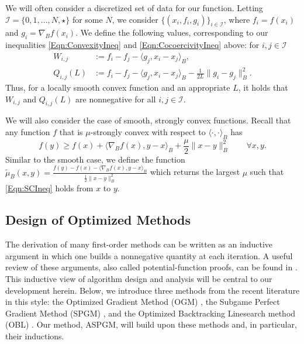 \documentclass[11pt]{article}
\numberwithin{equation}{section}
\newcommand{\I}{\mathcal{I}}
\newcommand{\gradB}{\nabla_{\!\!{\scriptscriptstyle B}}}
\newcommand{\dotB}[2]{\langle {#1}, {#2} \rangle_B}
\newcommand{\normB}[1]{\|{#1}\|_B}
\theoremstyle{definition}
\theoremstyle{plain}
\theoremstyle{definition}
\begin{document}
We will often consider a discretized set of data for our function. Letting $\I = \{0, 1, \dots, N, \star\}$ for some $N$, we consider $\{(x_i, f_i, g_i) \}_{i \in \I}$, where $f_i = f(x_i)$ and $g_i = \gradB f(x_i)$. We define the following values, corresponding to our inequalities \eqref{Eqn:ConvexityIneq} and \eqref{Eqn:CocoercivityIneq} above: for $i,j\in\I$
\begin{align} \label{Eqn:Def_WQV}
    W_{i,j} &:= f_i - f_j - \dotB{g_j}{x_i - x_j}, \\
    Q_{i,j}(L) &:= f_i - f_j - \dotB{g_j}{x_i - x_j} - \frac{1}{2L} \normB{g_i - g_j}^2.
\end{align}
Thus, for a locally smooth convex function and an appropriate $L$, it holds that $W_{i,j}$ and $Q_{i,j}(L)$ are nonnegative for all $i,j \in \I$.

We will also consider the case of smooth, strongly convex functions. Recall that any function $f$ that is $\mu$-strongly convex with respect to $\langle\cdot,\cdot \rangle_B$ has 
\begin{equation} \label{Eqn:SCIneq}
    f(y) \geq f(x) + \dotB{\gradB f(x)}{y-x} + \frac{\mu}{2}\normB{x-y}^2 \qquad \forall x,y.
\end{equation}
Similar to the smooth case, we define the function $\tilde{\mu}_B(x,y) = \frac{f(y) - f(x) - \dotB{\gradB f(x)}{y-x}}{\frac{1}{2}\normB{x-y}^2}$
which returns the largest $\mu$ such that \eqref{Eqn:SCIneq} holds from $x$ to $y$.


\subsection{Design of Optimized Methods} \label{SubSec:Prelim_Design}
The derivation of many first-order methods can be written as an inductive argument in which one builds a nonnegative quantity at each iteration. A useful review of these arguments, also called potential-function proofs, can be found in \cite{PotentialFunctionProofs_Bansal,d_Aspremont_2021}. This inductive view of algorithm design and analysis will be central to our development herein. Below, we introduce three methods from the recent literature in this style: the Optimized Gradient Method (OGM) \cite{OGM}, the Subgame Perfect Gradient Method (SPGM) \cite{SPGM}, and the Optimized Backtracking Linesearch method (OBL) \cite{OBL}. Our method, ASPGM, will build upon these methods and, in particular, their inductions.
\end{document}
